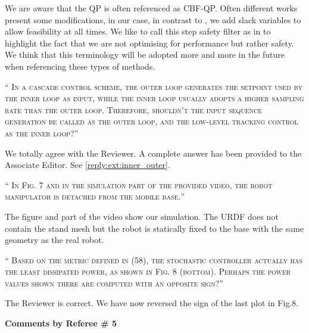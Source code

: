 \documentclass[10pt]{article}
\newcommand{\referee}[1]{\;
  \begin{minipage}[t]{.95\textwidth}
    ``{\small\color{red} \textsc{#1}}''
  \end{minipage}\medskip
  }
\begin{document}
\begin{enumerate}[label={[R3:\,\arabic{enumi}]}]
We are aware that the QP is often referenced as CBF-QP. Often different works present some modifications, in our case, in contrast to \cite{ames2019control}, we add slack variables to allow feasibility at all times. We like to call this step safety filter as in \cite{wabersich2021predictive} to highlight the fact that we are not optimising for performance but rather safety. We think that this terminology will be adopted more and more in the future when referencing these types of methods.

\item\label{reply:R3:13} 
\referee{In a cascade control scheme, the outer loop generates the setpoint used by the inner loop as input, while the inner loop usually adopts a higher sampling rate than the outer loop. Therefore, shouldn't the input sequence generation be called as the outer loop, and the low-level tracking control as the inner loop?}

We totally agree with the Reviewer. A complete answer has been provided to the Associate Editor. See \ref{reply:ext:inner_outer}.

\item\label{reply:R3:14} 
\referee{In Fig. 7 and in the simulation part of the provided video, the robot manipulator is detached from the mobile base.}

The figure and part of the video show our simulation. The URDF does not contain the stand mesh but the robot is statically fixed to the base with the same geometry as the real robot.

\item\label{reply:R3:15} 
\referee{Based on the metric defined in (58), the stochastic controller  actually has the least dissipated power, as shown in Fig. 8 (bottom). Perhaps the power values shown there are computed with an opposite sign?}

The Reviewer is correct. We have now reversed the sign of the last plot in Fig.8.

\end{enumerate}


\clearpage
\bigskip
\hspace*{-25pt} \textbf{\large Comments by Referee \# 5}
\end{document}
